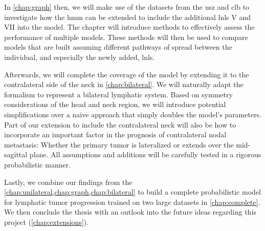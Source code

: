 \documentclass[\relativeRoot/main.tex]{subfiles}
\begin{document}
In \cref{chap:graph} then, we will make use of the datasets from the \gls{usz} and \gls{clb} to investigate how the \gls{hmm} can be extended to include the additional \glspl{lnl} V and VII into the model. The chapter will introduce methods to effectively assess the performance of multiple models. These methods will then be used to compare models that are built assuming different pathways of spread between the individual, and especially the newly added, \glspl{lnl}.

Afterwards, we will complete the coverage of the model by extending it to the contralateral side of the neck in \cref{chap:bilateral}. We will naturally adapt the formalism to represent a bilateral lymphatic system. Based on symmetry considerations of the head and neck region, we will introduce potential simplifications over a naive approach that simply doubles the model's parameters. Part of our extension to include the contralateral neck will also be how to incorporate an important factor in the prognosis of contralateral nodal metastasis: Whether the primary tumor is lateralized or extends over the mid-sagittal plane. All assumptions and additions will be carefully tested in a rigorous probabilistic manner.

Lastly, we combine our findings from the \cref{chap:unilateral,chap:graph,chap:bilateral} to build a complete probabilistic model for lymphatic tumor progression trained on two large datasets in \cref{chap:complete}. We then conclude the thesis with an outlook into the future ideas regarding this project (\cref{chap:extensions}).
\end{document}
